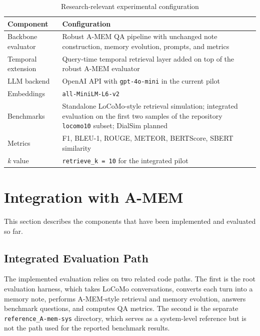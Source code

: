 \documentclass[conference]{IEEEtran}
\begin{document}
\begin{table}[htbp]
\caption{Research-relevant experimental configuration}
\label{tab:tools}
\centering
\small
\begin{tabular}{p{2.4cm}p{5.0cm}}
\toprule
\textbf{Component} & \textbf{Configuration} \\
\midrule
Backbone evaluator & Robust A-MEM QA pipeline with unchanged note construction, memory evolution, prompts, and metrics \\
Temporal extension & Query-time temporal retrieval layer added on top of the robust A-MEM evaluator \\
LLM backend & OpenAI API with \texttt{gpt-4o-mini} in the current pilot \\
Embeddings & \texttt{all-MiniLM-L6-v2} \\
Benchmarks & Standalone LoCoMo-style retrieval simulation; integrated evaluation on the first two samples of the repository \texttt{locomo10} subset; DialSim planned \\
Metrics & F1, BLEU-1, ROUGE, METEOR, BERTScore, SBERT similarity \\
\textit{k} value & \texttt{retrieve\_k = 10} for the integrated pilot \\
\bottomrule
\end{tabular}
\end{table}

\section{Integration with A-MEM}

This section describes the components that have been implemented and evaluated so far.

\subsection{Integrated Evaluation Path}

The implemented evaluation relies on two related code paths. The first is the root evaluation harness, which takes LoCoMo conversations, converts each turn into a memory note, performs A-MEM-style retrieval and memory evolution, answers benchmark questions, and computes QA metrics. The second is the separate \texttt{reference\_A-mem-sys} directory, which serves as a system-level reference but is not the path used for the reported benchmark results.
\end{document}
